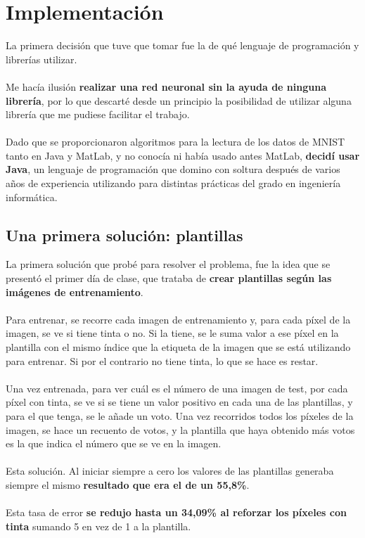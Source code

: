 \section{Implementación}

La primera decisión que tuve que tomar fue la de qué lenguaje de programación y librerías utilizar. 
\\ \\
Me hacía ilusión \textbf{realizar una red neuronal sin la ayuda de ninguna librería}, por lo que descarté desde un principio la posibilidad de utilizar alguna librería que me pudiese facilitar el trabajo. 
\\ \\
Dado que se proporcionaron algoritmos para la lectura de los datos de MNIST tanto en Java y MatLab, y no conocía ni había usado antes MatLab, \textbf{decidí usar Java}, un lenguaje de programación que domino con soltura después de varios años de experiencia utilizando para distintas prácticas del grado en ingeniería informática.

\subsection{Una primera solución: plantillas}

La primera solución que probé para resolver el problema, fue la idea que se presentó el primer día de clase, que trataba de \textbf{crear plantillas según las imágenes de entrenamiento}.
\\ \\
Para entrenar, se recorre cada imagen de entrenamiento y, para cada píxel de la imagen, se ve si tiene tinta o no. Si la tiene, se le suma valor a ese píxel en la plantilla con el mismo índice que la etiqueta de la imagen que se está utilizando para entrenar. Si por el contrario no tiene tinta, lo que se hace es restar.
\\ \\
Una vez entrenada, para ver cuál es el número de una imagen de test, por cada píxel con tinta, se ve si se tiene un valor positivo en cada una de las plantillas, y para el que tenga, se le añade un voto. Una vez recorridos todos los píxeles de la imagen, se hace un recuento de votos, y la plantilla que haya obtenido más votos es la que indica el número que se ve en la imagen.
\\ \\
Esta solución. Al iniciar siempre a cero los valores de las plantillas generaba siempre el mismo \textbf{resultado que era el de un 55,8\%}.
\\ \\
Esta tasa de error \textbf{se redujo hasta un 34,09\% al reforzar los píxeles con tinta} sumando 5 en vez de 1 a la plantilla.

